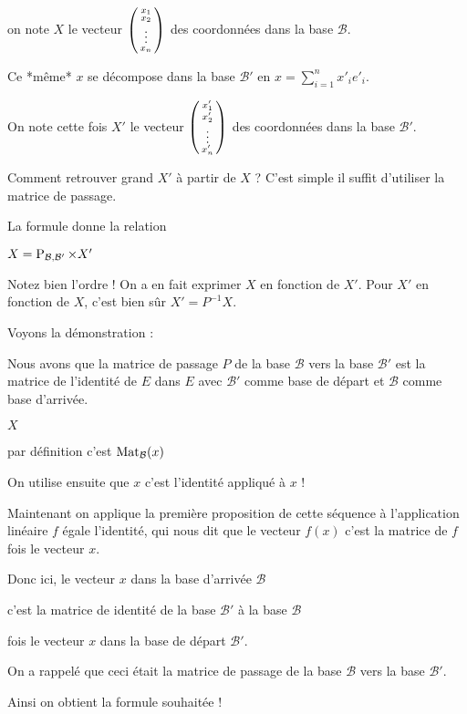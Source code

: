 \change
on note $X$ le vecteur $\left(\begin{smallmatrix}x_1\cr x_2\cr \vdots \cr x_n
\end{smallmatrix}\right)$ des coordonnées dans la base $\mathcal{B}$.

\change
Ce *même* $x$ se décompose dans la base $\mathcal{B}'$ en $x=\sum_{i=1}^n x'_ie'_i$.

\change
On note cette fois $X'$ le vecteur 
$\left(\begin{smallmatrix}x'_1\cr x'_2\cr \vdots \cr x'_n
\end{smallmatrix}\right)$ 
des coordonnées dans la base $\mathcal{B}'$.

\change
Comment retrouver grand $X'$ à partir de $X$ ?
C'est simple il suffit d'utiliser la matrice de passage.

La formule donne la relation 

$X = \mathop{\text{P}}\nolimits_{\mathcal{B},\mathcal{B}'} \times X'$


Notez bien l'ordre ! On a en fait exprimer $X$ en fonction de $X'$.
Pour $X'$ en fonction de $X$, c'est bien sûr $X' = P^{-1} X$.

\change
Voyons la démonstration :

Nous avons que la matrice de passage $P$ de la base $\mathcal{B}$ vers la base $\mathcal{B}'$
est la matrice de l'identité de $E$ dans $E$ avec $\mathcal{B}'$ 
comme base de départ et $\mathcal{B}$ comme base d'arrivée.

\change
$X$ 

\change
par définition c'est $\mathop{\mathrm{Mat}}\nolimits_\mathcal{B} (x)$

\change
On utilise ensuite que $x$ c'est l'identité appliqué à $x$ !

\change
Maintenant on applique la première proposition de cette séquence à l'application linéaire  $f$ égale l'identité, qui nous dit que le vecteur $f(x)$ c'est la matrice de $f$ fois le vecteur $x$. 

Donc ici, le vecteur $x$ dans la base d'arrivée $\mathcal{B}$

c'est la matrice de identité de la base $\mathcal{B}'$ à la base $\mathcal{B}$

fois le vecteur $x$ dans la base de départ $\mathcal{B}'$.


\change
On a rappelé que ceci était la matrice de passage de la base $\mathcal{B}$ vers la base $\mathcal{B}'$.

Ainsi on obtient la formule souhaitée !


\diapo

